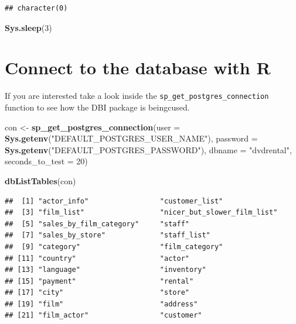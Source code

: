 \documentclass[]{book}
\newenvironment{Shaded}{\begin{snugshade}}{\end{snugshade}}
\newcommand{\DataTypeTok}[1]{\textcolor[rgb]{0.13,0.29,0.53}{#1}}
\newcommand{\DecValTok}[1]{\textcolor[rgb]{0.00,0.00,0.81}{#1}}
\newcommand{\KeywordTok}[1]{\textcolor[rgb]{0.13,0.29,0.53}{\textbf{#1}}}
\newcommand{\NormalTok}[1]{#1}
\newcommand{\StringTok}[1]{\textcolor[rgb]{0.31,0.60,0.02}{#1}}
\theoremstyle{definition}
\theoremstyle{definition}
\theoremstyle{definition}
\theoremstyle{remark}
\begin{document}
\begin{verbatim}
## character(0)
\end{verbatim}

\begin{Shaded}
\begin{Highlighting}[]
\KeywordTok{Sys.sleep}\NormalTok{(}\DecValTok{3}\NormalTok{)}
\end{Highlighting}
\end{Shaded}

\hypertarget{connect-to-the-database-with-r}{%
\section{Connect to the database with
R}\label{connect-to-the-database-with-r}}

If you are interested take a look inside the
\texttt{sp\_get\_postgres\_connection} function to see how the DBI
package is beingcused.

\begin{Shaded}
\begin{Highlighting}[]
\NormalTok{con <-}\StringTok{ }\KeywordTok{sp_get_postgres_connection}\NormalTok{(}\DataTypeTok{user =} \KeywordTok{Sys.getenv}\NormalTok{(}\StringTok{"DEFAULT_POSTGRES_USER_NAME"}\NormalTok{),}
                                  \DataTypeTok{password =} \KeywordTok{Sys.getenv}\NormalTok{(}\StringTok{"DEFAULT_POSTGRES_PASSWORD"}\NormalTok{),}
                                  \DataTypeTok{dbname =} \StringTok{"dvdrental"}\NormalTok{,}
                                  \DataTypeTok{seconds_to_test =} \DecValTok{20}\NormalTok{)}

\KeywordTok{dbListTables}\NormalTok{(con)}
\end{Highlighting}
\end{Shaded}

\begin{verbatim}
##  [1] "actor_info"                 "customer_list"             
##  [3] "film_list"                  "nicer_but_slower_film_list"
##  [5] "sales_by_film_category"     "staff"                     
##  [7] "sales_by_store"             "staff_list"                
##  [9] "category"                   "film_category"             
## [11] "country"                    "actor"                     
## [13] "language"                   "inventory"                 
## [15] "payment"                    "rental"                    
## [17] "city"                       "store"                     
## [19] "film"                       "address"                   
## [21] "film_actor"                 "customer"
\end{verbatim}
\end{document}
